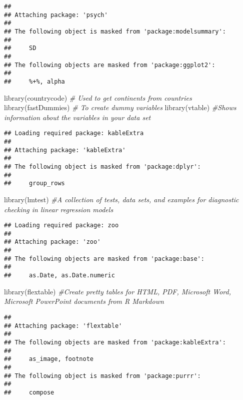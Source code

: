 \documentclass[
]{article}
\newenvironment{Shaded}{\begin{snugshade}}{\end{snugshade}}
\newcommand{\CommentTok}[1]{\textcolor[rgb]{0.56,0.35,0.01}{\textit{#1}}}
\newcommand{\FunctionTok}[1]{\textcolor[rgb]{0.00,0.00,0.00}{#1}}
\newcommand{\NormalTok}[1]{#1}
\begin{document}
\begin{verbatim}
## 
## Attaching package: 'psych'
## 
## The following object is masked from 'package:modelsummary':
## 
##     SD
## 
## The following objects are masked from 'package:ggplot2':
## 
##     %+%, alpha
\end{verbatim}

\begin{Shaded}
\begin{Highlighting}[]
\FunctionTok{library}\NormalTok{(countrycode) }\CommentTok{\# Used to get continents from countries}
\FunctionTok{library}\NormalTok{(fastDummies) }\CommentTok{\# To create dummy variables}
\FunctionTok{library}\NormalTok{(vtable) }\CommentTok{\#Shows information about the variables in your data set}
\end{Highlighting}
\end{Shaded}

\begin{verbatim}
## Loading required package: kableExtra
## 
## Attaching package: 'kableExtra'
## 
## The following object is masked from 'package:dplyr':
## 
##     group_rows
\end{verbatim}

\begin{Shaded}
\begin{Highlighting}[]
\FunctionTok{library}\NormalTok{(lmtest) }\CommentTok{\#A collection of tests, data sets, and examples for diagnostic checking in linear regression models}
\end{Highlighting}
\end{Shaded}

\begin{verbatim}
## Loading required package: zoo
## 
## Attaching package: 'zoo'
## 
## The following objects are masked from 'package:base':
## 
##     as.Date, as.Date.numeric
\end{verbatim}

\begin{Shaded}
\begin{Highlighting}[]
\FunctionTok{library}\NormalTok{(flextable) }\CommentTok{\#Create pretty tables for \textquotesingle{}HTML\textquotesingle{}, \textquotesingle{}PDF\textquotesingle{}, \textquotesingle{}Microsoft Word\textquotesingle{}, \textquotesingle{}Microsoft PowerPoint\textquotesingle{} documents from \textquotesingle{}R Markdown\textquotesingle{} }
\end{Highlighting}
\end{Shaded}

\begin{verbatim}
## 
## Attaching package: 'flextable'
## 
## The following objects are masked from 'package:kableExtra':
## 
##     as_image, footnote
## 
## The following object is masked from 'package:purrr':
## 
##     compose
\end{verbatim}
\end{document}
